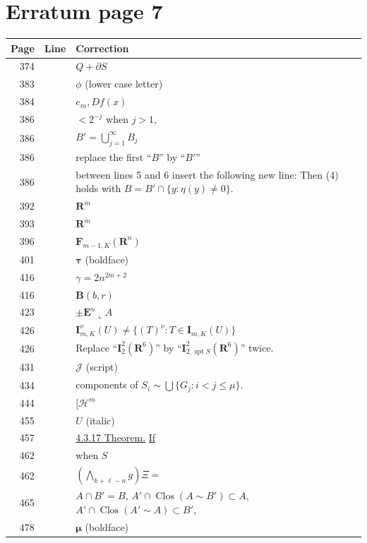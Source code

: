 \documentclass[11pt]{article}
\makeatletter
\newcommand{\R}{\mathbf R}
\newcommand{\Haus}{\mathscr H}
\newcommand{\restrict}{\mathbin{\llcorner}}
\newcommand{\spt}{\operatorname{spt}}
\newcommand{\Clos}{\operatorname{Clos}}
\newcommand{\B}{\mathbf B}
\newcommand{\E}{\mathbf E}
\newcommand{\entry}[3]{#1&#2&#3\\[4pt]}
\newenvironment{corrections}{%
  \begin{longtable}{@{}r >{\raggedright\arraybackslash}p{21mm} >{\raggedright\arraybackslash}p{118mm}@{}}
  \textbf{Page}&\textbf{Line}&\textbf{Correction}\\\hline\endhead
}{\end{longtable}}
\makeatother
\begin{document}
\section*{Erratum page 7}
\begin{corrections}
\entry{374}{16}{$Q+\partial S$}
\entry{383}{16}{$\phi$ (lower case letter)}
\entry{384}{19}{$e_m,Df(x)$}
\entry{386}{2}{$<2^{-j}$ when $j>1$,}
\entry{386}{3}{$\displaystyle B'=\bigcup_{j=1}^{\infty}B_j$}
\entry{386}{5}{replace the first ``$B$'' by ``$B'$''}
\entry{386}{5}{between lines 5 and 6 insert the following new line:\newline
Then (4) holds with $B=B'\cap\{y:\eta(y)\ne0\}$.}
\entry{392}{14}{$\R^m$}
\entry{393}{25}{$\R^m$}
\entry{396}{16}{$\mathbf F_{m-1,K}(\R^n)$}
\entry{401}{12}{$\bm\tau$ (boldface)}
\entry{416}{2}{$\gamma=2n^{2m+2}$}
\entry{416}{15}{$\B(b,r)$}
\entry{423}{18}{$\pm\E^n\restrict A$}
\entry{426}{12}{$\mathbf I_{m,K}^{\nu}(U)\ne\{(T)^\nu:T\in\mathbf I_{m,K}(U)\}$}
\entry{426}{16}{Replace ``$\mathbf I_2^2(\R^6)$'' by ``$\mathbf I_{2,\spt S}^{2}(\R^6)$'' twice.}
\entry{431}{28}{$\mathscr J$ (script)}
\entry{434}{9}{components of $S_i\sim\bigcup\{G_j:i<j\le\mu\}$.}
\entry{444}{20}{$[\Haus^m$}
\entry{455}{30}{$U$ (italic)}
\entry{457}{18}{\underline{4.3.17 Theorem.} \underline{If}}
\entry{462}{1}{when $S$}
\entry{462}{23}{$(\bigwedge_{k+\ell-n}g)\Xi=$}
\entry{465}{18}{$A\cap B'=B$, $A'\cap\Clos(A\sim B')\subset A$, $A'\cap\Clos(A'\sim A)\subset B'$,}
\entry{478}{26}{$\bm\mu$ (boldface)}
\end{corrections}
\end{document}
